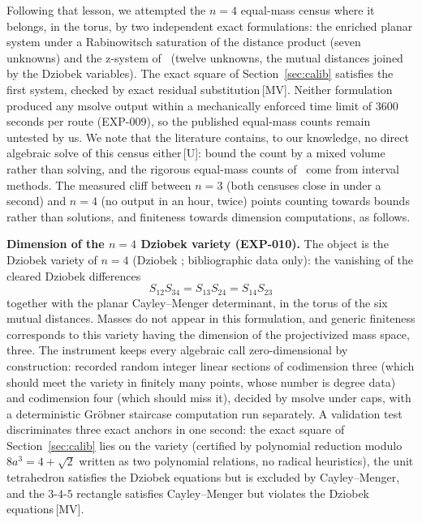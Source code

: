 \documentclass[11pt]{article}
\theoremstyle{definition}
\theoremstyle{remark}
\newcommand{\mk}[1]{\,{\scriptsize[#1]}}
\newcommand{\MV}{\mk{MV}}
\newcommand{\Um}{\mk{U}}
\begin{document}
Following that lesson, we attempted the $n=4$ equal-mass census where it belongs,
in the torus, by two independent exact formulations: the enriched planar system
under a Rabinowitsch saturation of the distance product (seven unknowns) and the
z-system of~\cite{HM06} (twelve unknowns, the mutual distances joined by the
Dziobek variables). The exact square of Section~\ref{sec:calib} satisfies the first system,
checked by exact residual substitution\MV. Neither formulation produced any
msolve output within a mechanically enforced time limit of 3600 seconds %
per route (EXP-009), so the published equal-mass counts remain untested by us.
We note that the literature contains, to our knowledge, no direct algebraic
solve of this census either\Um: \cite{HM06} bound the count by a mixed volume
rather than solving, and the rigorous equal-mass counts of~\cite{MZ19} come from
interval methods. The measured cliff between $n=3$ (both censuses close in under
a second) and $n=4$ (no output in an hour, twice) points counting towards bounds
rather than solutions, and finiteness towards dimension computations, as follows.

\medskip
\noindent\textbf{Dimension of the $n=4$ Dziobek variety (EXP-010).}
The object is the Dziobek variety of $n=4$ (Dziobek \cite{Dziobek00}; bibliographic data only): the vanishing of the cleared Dziobek
differences
\begin{equation}\label{eq:dziobek}
S_{12}S_{34}=S_{13}S_{24}=S_{14}S_{23}
\end{equation}
together with the planar
Cayley--Menger determinant, in the torus of the six mutual distances. Masses do
not appear in this formulation, and generic finiteness corresponds to this
variety having the dimension of the projectivized mass space, three. The
instrument keeps every algebraic call zero-dimensional by construction: recorded
random integer linear sections of codimension three (which should meet the
variety in finitely many points, whose number is degree data) and codimension
four (which should miss it), decided by msolve under caps, with a deterministic
Gr\"obner staircase computation run separately. A validation test discriminates
three exact anchors in one second: the exact square of Section~\ref{sec:calib} lies on the
variety (certified by polynomial reduction modulo $8a^3=4+\sqrt{2}$ written as
two polynomial relations, no radical heuristics), the unit tetrahedron satisfies
the Dziobek equations but is excluded by Cayley--Menger, and the $3$-$4$-$5$
rectangle satisfies Cayley--Menger but violates the Dziobek equations\MV.
\end{document}
